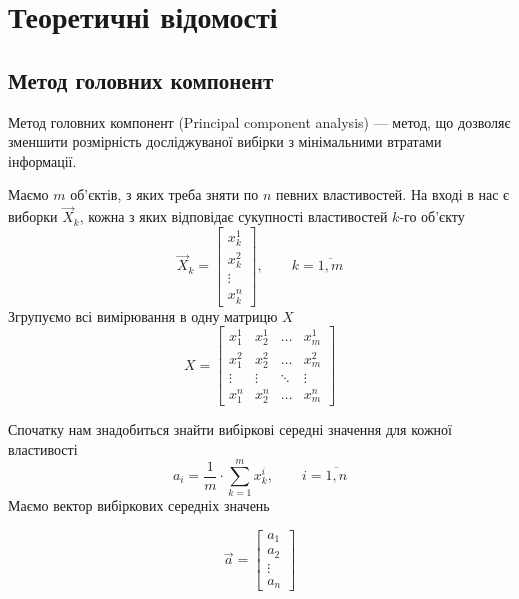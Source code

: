 \section{Теоретичні відомості}
\subsection{Метод головних компонент}
Метод головних компонент (Principal component analysis) --- метод, що дозволяє
зменшити розмірність досліджуваної вибірки з мінімальними втратами інформації.
\cite{Aivazyan:1989}

Маємо $m$ об’єктів, з яких треба зняти по $n$ певних властивостей.
На вході в нас є виборки $\vec{X}_k$, кожна з яких відповідає сукупності
властивостей $k$-го об’єкту
\begin{equation*}
  \vec{X}_k = \begin{bmatrix}
    x_k^1  \\
    x_k^2  \\
    \vdots \\
    x_k^n
  \end{bmatrix},
  \qquad k = \overline{1,m}
\end{equation*}
Згрупуємо всі вимірювання в одну матрицю $X$
\begin{equation*}
  X = \begin{bmatrix}
    x_1^1  & x_2^1  & \dots  & x_m^1  \\
    x_1^2  & x_2^2  & \dots  & x_m^2  \\
    \vdots & \vdots & \ddots & \vdots \\
    x_1^n  & x_2^n  & \dots  & x_m^n
  \end{bmatrix}
\end{equation*}

Спочатку нам знадобиться знайти вибіркові середні значення для кожної
властивості
\begin{equation*}
  a_i = \frac{1}{m} \cdot \sum_{k=1}^{m} x_k^i, \qquad i = \overline{1,n}
\end{equation*}
Маємо вектор вибіркових середніх значень

\begin{equation*}
  \vec{a} = \begin{bmatrix}
    a_1    \\
    a_2    \\
    \vdots \\
    a_n
  \end{bmatrix}
\end{equation*}

